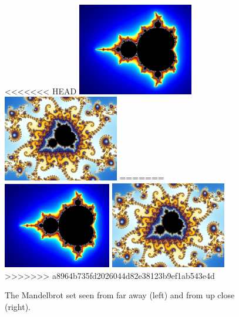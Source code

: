 \documentclass[a4paper,12pt]{article}
\begin{document}
\begin{figure}[h]
    \centering
    \begin{minipage}{1\textwidth}
        \centering
<<<<<<< HEAD
        \includegraphics[width = 0.45\textwidth]{Mandelbrot_far.jpg}
        \includegraphics[width = 0.45\textwidth]{MAndelbrot_close.jpg}
=======
        \includegraphics[width = 0.42\textwidth]{Mandelbrot_far.jpg}
        \includegraphics[width = 0.45\textwidth]{Mandelbrot_close.jpg}
>>>>>>> a8964b735fd2026044d82e38123b9ef1ab543e4d
    \end{minipage}
    \caption{The Mandelbrot set seen from far away (left) and from up close (right).}
    \label{fig:Mandelbrot}
\end{figure}
\end{document}
